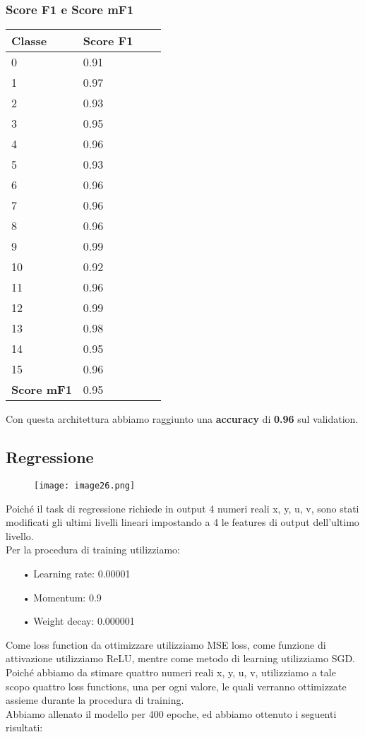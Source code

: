 \subsubsection{Score F1 e Score mF1}
\begin{center}
	\begin{tabular}{| l | l | l | l |}
		\hline
		Classe & Score F1 \\ \hline
		0 & 0.91 \\ \hline
		1 & 0.97 \\ \hline
		2 & 0.93 \\ \hline
		3 & 0.95 \\ \hline
		4 & 0.96 \\ \hline
		5 & 0.93 \\ \hline
		6 & 0.96 \\ \hline
		7 & 0.96 \\ \hline
		8 & 0.96 \\ \hline
		9 & 0.99 \\ \hline
		10 & 0.92 \\ \hline
		11 & 0.96 \\ \hline
		12 & 0.99 \\ \hline
		13 & 0.98 \\ \hline
		14 & 0.95\\ \hline
		15 & 0.96 \\ \hline 
		{\bf Score mF1} & 0.95 \\ \hline							
	\end{tabular}
\end{center}
Con questa architettura abbiamo raggiunto una {\bf accuracy} di {\bf 0.96} sul validation.

\subsection{Regressione}
\begin{figure}[H]
	\centering
	\texttt{[image: image26.png]}
\end{figure}
Poiché il task di regressione richiede in output 4 numeri reali x, y, u, v, sono stati modificati gli ultimi livelli lineari impostando a 4 le features di output dell’ultimo livello. \\
Per la procedura di training utilizziamo:
\begin{itemize}
	\item[•]Learning rate: 0.00001
	\item[•]Momentum: 0.9
	\item[•]Weight decay: 0.000001
\end{itemize} 
Come loss function da ottimizzare utilizziamo MSE loss, come funzione di attivazione utilizziamo ReLU, mentre come metodo di learning utilizziamo SGD. \\
Poiché abbiamo da stimare quattro numeri reali x, y, u, v, utilizziamo a tale scopo quattro loss functions, una per ogni valore, le quali verranno ottimizzate assieme durante la procedura di training. \\
Abbiamo allenato il modello per 400 epoche, ed abbiamo ottenuto i seguenti risultati:

